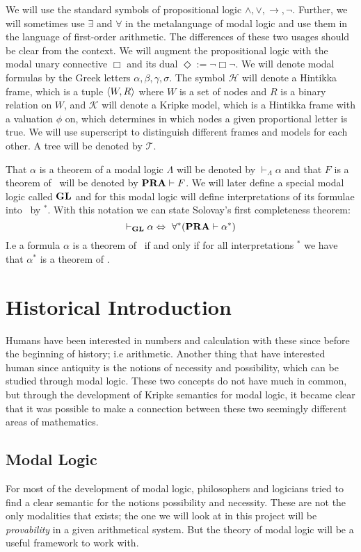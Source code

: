 \documentclass[../main.tex]{subfiles}
\begin{document}
We will use the standard symbols of propositional  logic
$\wedge,\vee,\rightarrow,\neg$. Further, we will sometimes use $\exists$ and
$\forall$ in the metalanguage of modal logic and use them in the language of
first-order arithmetic. The differences of these two usages should be clear
from the context. We will augment the propositional logic with the modal unary
connective $\Box$ and its dual $\Diamond:=\neg\Box\neg$. We will denote modal
formulas by the Greek letters $\alpha,\beta,\gamma,\sigma$. The symbol
$\mathcal{H}$ will denote a
Hintikka frame,  which is a tuple $\langle W,R\rangle$ where $W$ is a set of nodes and
$R$ is a binary relation on $W$, and
$\mathcal{K}$ will denote a Kripke model, which is a Hintikka frame with a
valuation $\phi$ on, which determines in which nodes a given proportional letter
is true. We will use superscript to distinguish different frames
and models for each other.
A tree will be denoted by $\mathcal{T}$.

That $\alpha$ is a theorem of a modal logic $\Lambda$ will be denoted by
$\vdash_\Lambda\alpha$ and that $F$ is a theorem of \PRA\ will be denoted by
$\text{\textbf{PRA}}\vdash F$. We will later define a special modal logic called $\text{\textbf{GL}}$ and for
this modal logic will define interpretations of its formulae into \PRA\ by
$^*$. With this notation we can state Solovay's first completeness theorem:
\[\vdash_{\text{\textbf{GL}}}\alpha\Leftrightarrow\ \forall ^*(\text{\textbf{PRA}}\vdash\alpha^*)\]
I.e a formula $\alpha$ is a theorem of \GL\ if and only if for all
interpretations $^*$ we have that $\alpha^*$ is a theorem of \PRA.

\section{Historical Introduction}
Humans have been interested in numbers and calculation with these since before
the beginning of history; i.e arithmetic. Another thing that have interested
human since antiquity is the notions of necessity and possibility, which can be
studied through modal logic. These two
concepts do not have much in common, but through the development of Kripke
semantics for modal logic, it became clear that it was possible to make a
connection between these two seemingly different areas of mathematics.

\subsection{Modal Logic}

For most of the development of modal logic, philosophers and logicians tried to
find a clear semantic for the notions possibility and necessity. These are not
the only modalities that exists; the one we will look at in this project will
be \textit{provability} in a given arithmetical system. But the theory of modal logic
will be a useful framework to work with.
\end{document}
